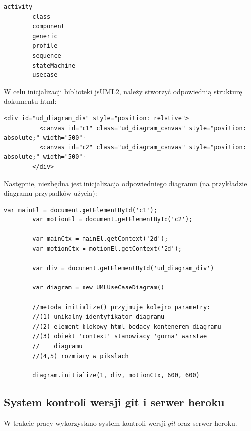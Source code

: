         \begin{lstlisting}[caption={pakiety modułów jsUML2}, label={lst:UDModules}]
        activity
        class
        component
        generic
        profile
        sequence
        stateMachine
        usecase
        \end{lstlisting}

        W celu inicjalizacji biblioteki jsUML2, należy stworzyć odpowiednią strukturę dokumentu html:

        \begin{lstlisting}[caption={HTML canvas element}, label={lst:HTML5Ex}]
        <div id="ud_diagram_div" style="position: relative">
          <canvas id="c1" class="ud_diagram_canvas" style="position: absolute;" width="500")
          <canvas id="c2" class="ud_diagram_canvas" style="position: absolute;" width="500")
        </div>
        \end{lstlisting}
      
        Następnie, niezbędna jest inicjalizacja odpowiedniego diagramu (na przykładzie diagramu przypadków użycia):

        \begin{lstlisting}[caption={HTML canvas element - JS}, label={lst:jsCanvasEx}]
        var mainEl = document.getElementById('c1');
        var motionEl = document.getElementById('c2');

        var mainCtx = mainEl.getContext('2d');
        var motionCtx = motionEl.getContext('2d');

        var div = document.getElementById('ud_diagram_div')

        var diagram = new UMLUseCaseDiagram()

        //metoda initialize() przyjmuje kolejno parametry:
        //(1) unikalny identyfikator diagramu
        //(2) element blokowy html bedacy kontenerem diagramu
        //(3) obiekt 'context' stanowiacy 'gorna' warstwe
        //    diagramu
        //(4,5) rozmiary w pikslach 

        diagram.initialize(1, div, motionCtx, 600, 600) 
        \end{lstlisting}

\subsection{System kontroli wersji git i serwer heroku}
  
  W trakcie pracy wykorzystano system kontroli wersji \emph{git} oraz serwer heroku. 

